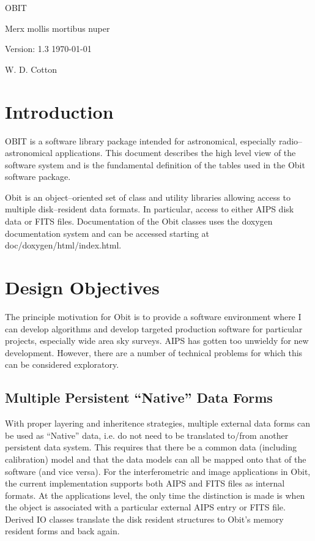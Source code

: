 \documentclass[11pt]{article}
\begin{document}
\setcounter{section}{0}

\vskip 5cm
\centerline{\ttlfont OBIT }
\vskip 1cm
\centerline{\ttlfont Merx mollis mortibus nuper}
\vskip 3cm
\centerline{\secfont Version: 1.3 \today}
\vskip 1cm
\centerline{\secfont W. D. Cotton}
\clearpage

\tableofcontents
\cleardoublepage

\section {Introduction}
OBIT is a software library package intended for astronomical,
especially radio--astronomical applications. 
This document describes the high level view of the software system and
is the fundamental definition of the tables  used in the Obit software
package.  

Obit is an object--oriented set of class and utility libraries
allowing access to multiple disk--resident data formats.
In particular, access to either AIPS disk data or FITS files.
Documentation of the Obit classes uses the doxygen documentation
system and can be accessed starting at doc/doxygen/html/index.html.

\section {Design Objectives}
The principle motivation for Obit is to provide a software environment
where I can develop algorithms and develop targeted production
software for particular projects, especially wide area sky surveys.
AIPS has gotten too unwieldy for new development.
However, there are a number of technical problems for which this can be
considered exploratory.

\subsection{Multiple Persistent ``Native'' Data Forms}
With proper layering and inheritence strategies, multiple external data
forms can be used as ``Native'' data, i.e. do not need to be
translated to/from another persistent data system.
This requires that there be a common data (including calibration)
model and that the data models can all be mapped onto that of the
software (and vice versa).
For the interferometric and image applications in Obit, the current
implementation supports both AIPS and FITS files as internal formats.
At the applications level, the only time the distinction is made is
when the object is associated with a particular external AIPS entry or
FITS file.
Derived IO classes translate the disk resident structures to Obit's
memory resident forms and back again.
\end{document}
